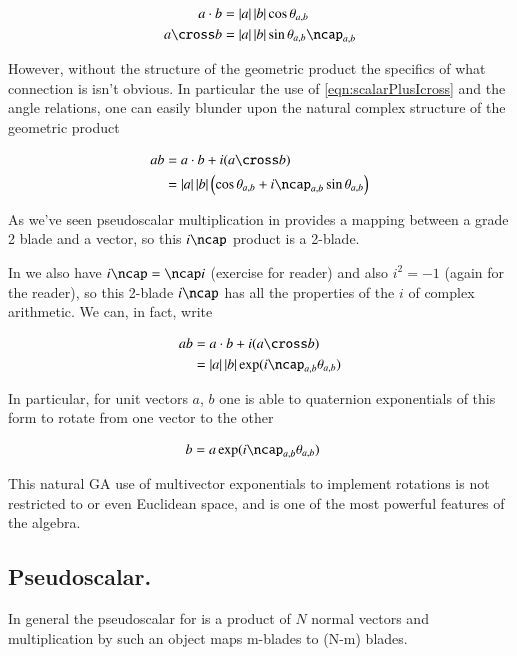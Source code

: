 \documentclass{article}
\begin{document}
\begin{align*}
a \cdot b &= \Abs{a}\Abs{b} \cos\theta_{a,b} \\
a \cross b &= \Abs{a}\Abs{b} \sin\theta_{a,b} \ncap_{a,b}
\end{align*}

However, without the structure of the geometric product the specifics of what 
connection is isn't obvious.  In particular the use of \ref{eqn:scalarPlusIcross} and the angle relations, one can easily
blunder upon the natural complex structure of the geometric product

\begin{align*}
a b 
&= a \cdot b + i (a \cross b) \\
&=
\Abs{a}\Abs{b} \left( \cos\theta_{a,b} + i\ncap_{a,b} \sin\theta_{a,b} \right) \\
\end{align*}

As we've seen pseudoscalar multiplication in  provides a mapping between a grade 2 blade and a vector, so 
this $i\ncap$ product is a 2-blade.

In  we also have $i \ncap = \ncap i$ (exercise for reader) and also $i^2 = -1$ (again for the reader), so this 
2-blade $i\ncap$ has all the properties of the $i$ of complex arithmetic.  We can, in fact, write

\begin{align*}
a b 
&= a \cdot b + i (a \cross b) \\
&=
\Abs{a}\Abs{b} \exp( i\ncap_{a,b} \theta_{a,b} )
\end{align*}

In particular, for unit vectors $a$, $b$ one is able to quaternion exponentials of this form to rotate from one vector to the other

\begin{align*}
b &= a \exp( i\ncap_{a,b} \theta_{a,b} )
\end{align*}

This natural GA use
of multivector exponentials to implement rotations is not restricted to  or even Euclidean space, and is one of the most
powerful features of the algebra.

\subsection{ Pseudoscalar. }

In general the
pseudoscalar for  is a product of $N$ normal vectors and multiplication by such an object maps m-blades to (N-m) blades.
\end{document}
